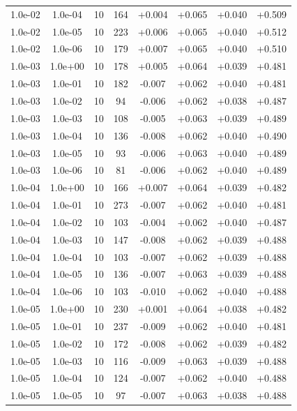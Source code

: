 \documentclass[11pt,a4paper]{article}
\begin{document}
\begin{table}
{\begin{tabular}{*{8}c}
 1.0e-02 	 & 1.0e-04 	 & 10 & 164 	 & +0.004 & +0.065 & +0.040 & +0.509 \\ 
 1.0e-02 	 & 1.0e-05 	 & 10 & 223 	 & +0.006 & +0.065 & +0.040 & +0.512 \\ 
 1.0e-02 	 & 1.0e-06 	 & 10 & 179 	 & +0.007 & +0.065 & +0.040 & +0.510 \\ 
 1.0e-03 	 & 1.0e+00 	 & 10 & 178 	 & +0.005 & +0.064 & +0.039 & +0.481 \\ 
 1.0e-03 	 & 1.0e-01 	 & 10 & 182 	 & -0.007 & +0.062 & +0.040 & +0.481 \\ 
 1.0e-03 	 & 1.0e-02 	 & 10 & 94 	 & -0.006 & +0.062 & +0.038 & +0.487 \\ 
 1.0e-03 	 & 1.0e-03 	 & 10 & 108 	 & -0.005 & +0.063 & +0.039 & +0.489 \\ 
 1.0e-03 	 & 1.0e-04 	 & 10 & 136 	 & -0.008 & +0.062 & +0.040 & +0.490 \\ 
 1.0e-03 	 & 1.0e-05 	 & 10 & 93 	 & -0.006 & +0.063 & +0.040 & +0.489 \\ 
 1.0e-03 	 & 1.0e-06 	 & 10 & 81 	 & -0.006 & +0.062 & +0.040 & +0.489 \\ 
 1.0e-04 	 & 1.0e+00 	 & 10 & 166 	 & +0.007 & +0.064 & +0.039 & +0.482 \\ 
 1.0e-04 	 & 1.0e-01 	 & 10 & 273 	 & -0.007 & +0.062 & +0.040 & +0.481 \\ 
 1.0e-04 	 & 1.0e-02 	 & 10 & 103 	 & -0.004 & +0.062 & +0.040 & +0.487 \\ 
 1.0e-04 	 & 1.0e-03 	 & 10 & 147 	 & -0.008 & +0.062 & +0.039 & +0.488 \\ 
 1.0e-04 	 & 1.0e-04 	 & 10 & 103 	 & -0.007 & +0.062 & +0.039 & +0.488 \\ 
 1.0e-04 	 & 1.0e-05 	 & 10 & 136 	 & -0.007 & +0.063 & +0.039 & +0.488 \\ 
 1.0e-04 	 & 1.0e-06 	 & 10 & 103 	 & -0.010 & +0.062 & +0.040 & +0.488 \\ 
 1.0e-05 	 & 1.0e+00 	 & 10 & 230 	 & +0.001 & +0.064 & +0.038 & +0.482 \\ 
 1.0e-05 	 & 1.0e-01 	 & 10 & 237 	 & -0.009 & +0.062 & +0.040 & +0.481 \\ 
 1.0e-05 	 & 1.0e-02 	 & 10 & 172 	 & -0.008 & +0.062 & +0.039 & +0.482 \\ 
 1.0e-05 	 & 1.0e-03 	 & 10 & 116 	 & -0.009 & +0.063 & +0.039 & +0.488 \\ 
 1.0e-05 	 & 1.0e-04 	 & 10 & 124 	 & -0.007 & +0.062 & +0.040 & +0.488 \\ 
 1.0e-05 	 & 1.0e-05 	 & 10 & 97 	 & -0.007 & +0.063 & +0.038 & +0.488 \\ 

\end{tabular}}
\end{table}
\end{document}
